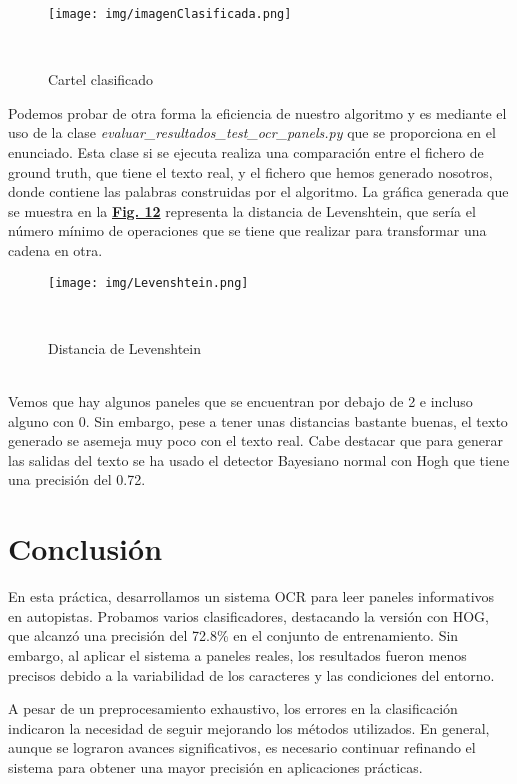 \documentclass[a4paper, 12pt]{article}
\begin{document}
\begin{figure}[h]
	\centering
	\texttt{[image: img/imagenClasificada.png]}
 	\caption{Cartel clasificado}\
	\label{fig:imagenClasificada}
\end{figure}

Podemos probar de otra forma la eficiencia de nuestro algoritmo y es mediante el uso de la clase \textit{evaluar\_resultados\_test\_ocr\_panels.py} que se proporciona en el enunciado. Esta clase si se ejecuta realiza una comparación entre el fichero de ground truth, que tiene el texto real, y el fichero que hemos generado nosotros, donde contiene las palabras construidas por el algoritmo. La gráfica generada que se muestra en la \textbf{\hyperref[fig:levenshtein]{Fig. 12}} representa la distancia de Levenshtein, que sería el número mínimo de operaciones que se tiene que realizar para transformar una cadena en otra. 
\begin{figure}[h]
	\centering
	\texttt{[image: img/Levenshtein.png]}
	\caption{Distancia de Levenshtein}\
	\label{fig:levenshtein}
\end{figure}
\\Vemos que hay algunos paneles que se encuentran por debajo de 2 e incluso alguno con 0. Sin embargo, pese a tener unas distancias bastante buenas, el texto generado se asemeja muy poco con el texto real. Cabe destacar que para generar las salidas del texto se ha usado el detector Bayesiano normal con Hogh que tiene una precisión del 0.72.

\section{Conclusión}
En esta práctica, desarrollamos un sistema OCR para leer paneles informativos en autopistas. Probamos varios clasificadores, destacando la versión con HOG, que alcanzó una precisión del 72.8\% en el conjunto de entrenamiento. Sin embargo, al aplicar el sistema a paneles reales, los resultados fueron menos precisos debido a la variabilidad de los caracteres y las condiciones del entorno.

A pesar de un preprocesamiento exhaustivo, los errores en la clasificación indicaron la necesidad de seguir mejorando los métodos utilizados. En general, aunque se lograron avances significativos, es necesario continuar refinando el sistema para obtener una mayor precisión en aplicaciones prácticas.
\end{document}
